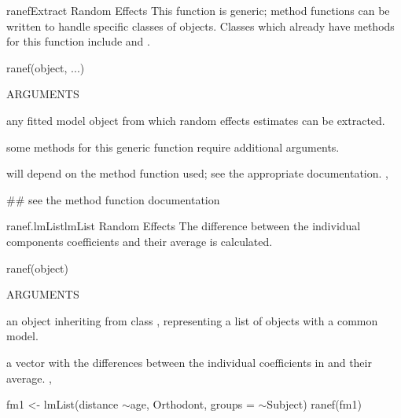 \documentclass[pdftex]{article} \usepackage{url,graphicx}
\renewcommand{\Twiddle}{\mbox{\(\sim\)}}
\begin{document}
\begin{Helpfile}{ranef}{Extract Random Effects}
This function is generic; method functions can be written to handle
specific classes of objects. Classes which already have methods for
this function include  and .
\begin{Example}
ranef(object, ...)
\end{Example}
\begin{Argument}{ARGUMENTS}
\item[\Co{object:}]
any fitted model object from which random effects
estimates can be extracted.
\item[\Co{...:}]
some methods for this generic function require additional
arguments.
\end{Argument}
will depend on the method function used; see the appropriate documentation.
,
\need 15pt
\vspace{-16pt} 
\begin{Example}
## see the method function documentation
\end{Example}
\end{Helpfile}
\begin{Helpfile}{ranef.lmList}{lmList Random Effects}
The difference between the individual  components
coefficients and their average is calculated.
\begin{Example}
ranef(object)
\end{Example}
\begin{Argument}{ARGUMENTS}
\item[\Co{object:}]
an object inheriting from class , representing
a list of  objects with a common model.
\end{Argument}
a vector with the differences between the individual 
coefficients in  and their average.
, 
\need 15pt
\vspace{-16pt} 
\begin{Example}
fm1 <- lmList(distance \Twiddle age, Orthodont, groups = \Twiddle Subject)
ranef(fm1)
\end{Example}
\end{Helpfile}
\end{document}
